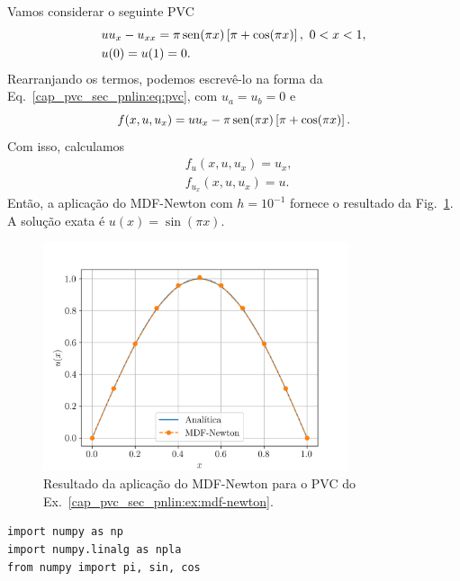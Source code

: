 \begin{ex}\label{cap_pvc_sec_pnlin:ex:mdf-newton}
  Vamos considerar o seguinte PVC
  \begin{subequations}\label{cap_pvc_sec_pnlin:eq:pvc-ex}
    \begin{align}
      &uu_x - u_{xx} = \pi\operatorname{sen}(\pi x)\left[\pi + \cos(\pi x)\right], ~0 < x < 1,\\
      &u(0) = u(1) = 0.
    \end{align}
  \end{subequations}
  Rearranjando os termos, podemos escrevê-lo na forma da Eq.~\eqref{cap_pvc_sec_pnlin:eq:pvc}, com $u_a=u_b=0$ e
  \begin{equation}
    f(x, u, u_x) = uu_x - \pi\operatorname{sen}(\pi x)\left[\pi + \cos(\pi x)\right].
  \end{equation}
  Com isso, calculamos
  \begin{subequations}
    \begin{align}
      &f_u(x, u, u_x) = u_x,\\
      &f_{u_x}(x, u, u_x) = u.
    \end{align}
  \end{subequations}
  Então, a aplicação do MDF-Newton com $h=10^{-1}$ fornece o resultado da Fig.~\ref{cap_pvc_sec_pnlin:fig:mdf-newton}. A solução exata é $u(x) = \sin(\pi x)$.

  \begin{figure}[H]
    \centering
    \includegraphics[width=0.8\textwidth]{./cap_pvc/dados/fig_mdf-newton/fig}
    \caption{Resultado da aplicação do MDF-Newton para o PVC do Ex.~\ref{cap_pvc_sec_pnlin:ex:mdf-newton}.}
    \label{cap_pvc_sec_pnlin:fig:mdf-newton}
  \end{figure}

\begin{lstlisting}[caption=mdf-newton.py]
import numpy as np
import numpy.linalg as npla
from numpy import pi, sin, cos


\end{lstlisting}
\end{ex}
